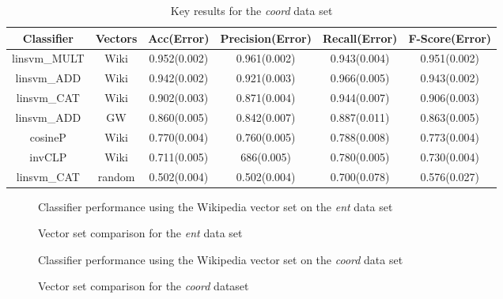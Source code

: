 \documentclass[11pt]{article}
\begin{document}
\begin{table*}[ht]
\centering
\begin{tabular}{|c|c|c|c|c|c|}
\hline
Classifier&Vectors&Acc(Error)&Precision(Error)&Recall(Error)&F-Score(Error)\\
\hline
linsvm\_MULT&Wiki&0.952(0.002)&0.961(0.002)&0.943(0.004)&0.951(0.002)\\
linsvm\_ADD&Wiki&0.942(0.002)&0.921(0.003)&0.966(0.005)&0.943(0.002)\\
linsvm\_CAT&Wiki&0.902(0.003)&0.871(0.004)&0.944(0.007)&0.906(0.003)\\
linsvm\_ADD&GW&0.860(0.005)&0.842(0.007)&0.887(0.011)&0.863(0.005)\\
\hline
cosineP&Wiki&0.770(0.004)&0.760(0.005)&0.788(0.008)&0.773(0.004)\\
invCLP&Wiki&0.711(0.005)&686(0.005)&0.780(0.005)&0.730(0.004)\\
linsvm\_CAT&random&0.502(0.004)&0.502(0.004)&0.700(0.078)&0.576(0.027)\\
\hline
\end{tabular}
\caption{Key results for the \emph{coord} data set}
\label{table:resultscoord}
\end{table*}

\begin{figure}[ht]
\centering
\caption{Classifier performance using the Wikipedia vector set on the \emph{ent} data set}
\label{fig:entclass}
\end{figure}

\begin{figure}[ht]
\centering
\caption{Vector set comparison for the \emph{ent} data set}
\label{fig:entvector}
\end{figure}

\begin{figure}[ht]
\centering
\caption{Classifier performance using the Wikipedia vector set on the \emph{coord} data set}
\label{fig:coordclass}
\end{figure}

\begin{figure}[ht]
\centering
\caption{Vector set comparison for the \emph{coord} dataset}
\label{fig:coordvector}
\end{figure}
\end{document}
